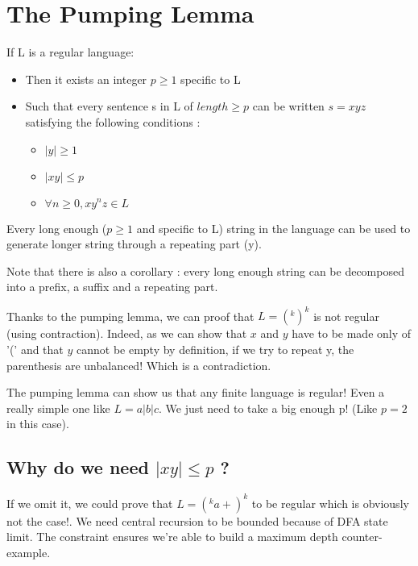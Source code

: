 \section{The Pumping Lemma}
    \theoremstyle{definition}
    \begin{definition}
        If L is a regular language:
        \begin{itemize}
            \item Then it exists an integer $p\geq 1$ specific to L
            \item Such that every sentence s in L of $length \geq p$ can be
            written $s = x y z$ satisfying the following conditions :
            \begin{itemize}
                \item $|y| \geq 1$
                \item $| x y| \leq p$
                \item $\forall n \geq 0, x y^n z \in L$
            \end{itemize}
        \end{itemize}

        Every long enough ($p\geq 1$ and specific to L) string in the language
        can be used to generate longer string through a repeating part (y).

        Note that there is also a corollary : every long enough string can be
        decomposed into a prefix, a suffix and a repeating part.
    \end{definition}

    Thanks to the pumping lemma, we can proof that $L = (^k )^k$ is not regular
    (using contraction). Indeed, as we can show that $x$ and $y$ have to be made
    only of '(' and that $y$ cannot be empty by definition, if we try to repeat
    y, the parenthesis are unbalanced! Which is a contradiction.

    The pumping lemma can show us that any finite language is regular! Even a
    really simple one like $L = a | b | c$. We just need to take a big enough p!
    (Like $p=2$ in this case).

    \subsection[Reasons]{Why do we need $|x y | \leq p$ ?}
        If we omit it, we could prove that $L = (^k a+ )^k$ to be regular which
        is obviously not the case!. We need central recursion to be bounded
        because of DFA state limit. The constraint ensures we're able to build a
        maximum depth counter-example.
